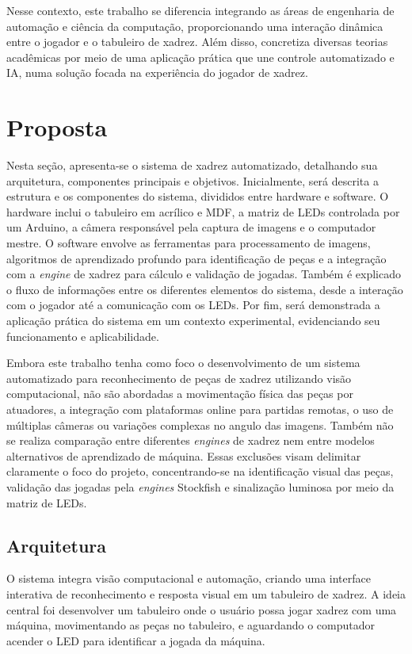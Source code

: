 \documentclass[journal]{IEEEtran} %
\begin{document}
Nesse contexto, este trabalho se diferencia integrando as áreas de engenharia de automação e ciência da computação, proporcionando uma interação dinâmica entre o jogador e o tabuleiro de xadrez. Além disso, concretiza diversas teorias acadêmicas por meio de uma aplicação prática que une controle automatizado e IA, numa solução focada na experiência do jogador de xadrez.

\section{Proposta}

Nesta seção, apresenta-se o sistema de xadrez automatizado, detalhando sua arquitetura, componentes principais e objetivos. Inicialmente, será descrita a estrutura e os componentes do sistema, divididos entre hardware e software. O hardware inclui o tabuleiro em acrílico e MDF, a matriz de LEDs controlada por um Arduino, a câmera responsável pela captura de imagens e o computador mestre. O software envolve as ferramentas para processamento de imagens, algoritmos de aprendizado profundo para identificação de peças e a integração com a \textit{engine} de xadrez para cálculo e validação de jogadas. Também é explicado o fluxo de informações entre os diferentes elementos do sistema, desde a interação com o jogador até a comunicação com os LEDs. Por fim, será demonstrada a aplicação prática do sistema em um contexto experimental, evidenciando seu funcionamento e aplicabilidade.

Embora este trabalho tenha como foco o desenvolvimento de um sistema automatizado para reconhecimento de peças de xadrez utilizando visão computacional, não são abordadas a movimentação física das peças por atuadores, a integração com plataformas online para partidas remotas, o uso de múltiplas câmeras ou variações complexas no angulo das imagens. Também não se realiza comparação entre diferentes \textit{engines} de xadrez nem entre modelos alternativos de aprendizado de máquina. Essas exclusões visam delimitar claramente o foco do projeto, concentrando-se na identificação visual das peças, validação das jogadas pela \textit{engines} Stockfish e sinalização luminosa por meio da matriz de LEDs.


\subsection{Arquitetura}

O sistema integra visão computacional e automação, criando uma interface interativa de reconhecimento e resposta visual em um tabuleiro de xadrez. A ideia central foi desenvolver um tabuleiro onde o usuário possa jogar xadrez com uma máquina, movimentando as peças no tabuleiro, e aguardando o computador acender o LED para identificar a jogada da máquina.
\end{document}
